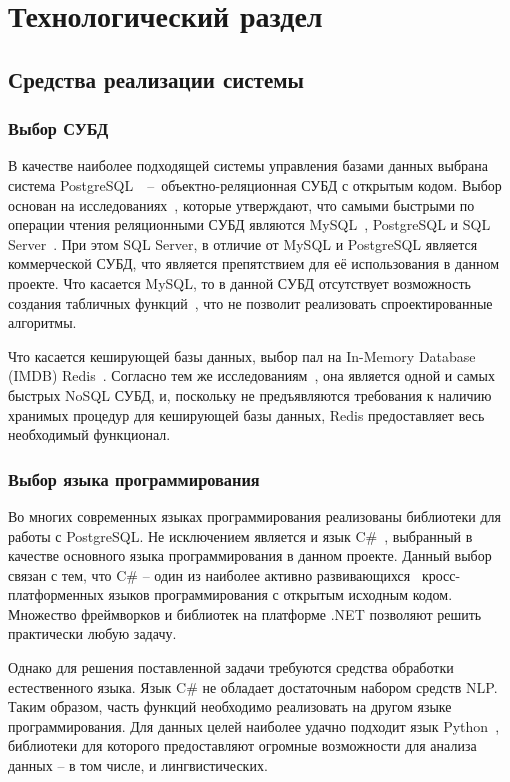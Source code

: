 \section{Технологический раздел}

\subsection{Средства реализации системы}

\subsubsection{Выбор СУБД}

В качестве наиболее подходящей системы управления базами данных выбрана система PostgreSQL~\cite{postgres}~--~объектно-реляционная СУБД с открытым кодом. 
Выбор основан на исследованиях~\cite{taipalus-DBMS-survey}, которые утверждают, что самыми быстрыми по операции чтения реляционными СУБД являются MySQL~\cite{mysql}, PostgreSQL и SQL Server~\cite{sql-server}. 
При этом SQL Server, в отличие от MySQL и PostgreSQL является коммерческой СУБД, что является препятствием для её использования в данном проекте. 
Что касается MySQL, то в данной СУБД отсутствует возможность создания табличных функций~\cite{mysql-functions}, что не позволит реализовать спроектированные алгоритмы.

Что касается кеширующей базы данных, выбор пал на In-Memory Database (IMDB) Redis~\cite{redis}. Согласно тем же исследованиям~\cite{taipalus-DBMS-survey}, она является одной и самых быстрых NoSQL СУБД, и, поскольку не предъявляются требования к наличию хранимых процедур для кеширующей базы данных, Redis предоставляет весь необходимый функционал.

\subsubsection{Выбор языка программирования}

Во многих современных языках программирования реализованы библиотеки для работы с PostgreSQL. 
Не исключением является и язык C$\#$~\cite{c-sharp}, выбранный в качестве основного языка программирования в данном проекте. 
Данный выбор связан с тем, что C$\#$ -- один из наиболее активно развивающихся~\cite{tiobe} кросс-платформенных языков программирования с открытым исходным кодом. Множество фреймворков и библиотек на платформе .NET позволяют решить практически любую задачу.

Однако для решения поставленной задачи требуются средства обработки естественного языка. 
Язык C$\#$ не обладает достаточным набором средств NLP. 
Таким образом, часть функций необходимо реализовать на другом языке программирования. 
Для данных целей наиболее удачно подходит язык Python~\cite{python}, библиотеки для которого предоставляют огромные возможности для анализа данных -- в том числе, и лингвистических.

